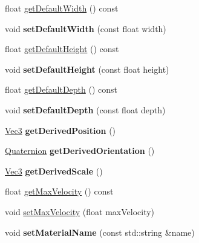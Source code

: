 \begin{DoxyCompactItemize}
\item 
float \hyperlink{classPUParticleSystem3D_acf39c57ba2ee73c1dfe332f5dbc5e8ae}{get\+Default\+Width} () const
\item 
\mbox{\label{classPUParticleSystem3D_af0a612067e6d21fb9b78198053966610}} 
void {\bfseries set\+Default\+Width} (const float width)
\item 
float \hyperlink{classPUParticleSystem3D_aa84fcaa662c5338f3e68abf8be181405}{get\+Default\+Height} () const
\item 
\mbox{\label{classPUParticleSystem3D_a654a99f4a4100b6ce0bdb435880d8904}} 
void {\bfseries set\+Default\+Height} (const float height)
\item 
float \hyperlink{classPUParticleSystem3D_a81c8c0bd0d0f40efa06c42bea476e9bf}{get\+Default\+Depth} () const
\item 
\mbox{\label{classPUParticleSystem3D_ad23c7ed7c6cddc14d77f8a9b030b8c4d}} 
void {\bfseries set\+Default\+Depth} (const float depth)
\item 
\mbox{\label{classPUParticleSystem3D_a3306fd04524df44f9d2633adb35008e7}} 
\hyperlink{classVec3}{Vec3} {\bfseries get\+Derived\+Position} ()
\item 
\mbox{\label{classPUParticleSystem3D_a08d199e57f3e7a37528887cb51e73fc0}} 
\hyperlink{classQuaternion}{Quaternion} {\bfseries get\+Derived\+Orientation} ()
\item 
\mbox{\label{classPUParticleSystem3D_a33330304dd11babc3c32ed3707f670c9}} 
\hyperlink{classVec3}{Vec3} {\bfseries get\+Derived\+Scale} ()
\item 
float \hyperlink{classPUParticleSystem3D_a37e80a563fc36e85af5dd32c9ae75eae}{get\+Max\+Velocity} () const
\item 
void \hyperlink{classPUParticleSystem3D_aa3c122c37511ee36d79854cf6c488022}{set\+Max\+Velocity} (float max\+Velocity)
\item 
\mbox{\label{classPUParticleSystem3D_abdb451552558f9bc88308de10013c932}} 
void {\bfseries set\+Material\+Name} (const std\+::string \&name)
\item 

\end{DoxyCompactItemize}
